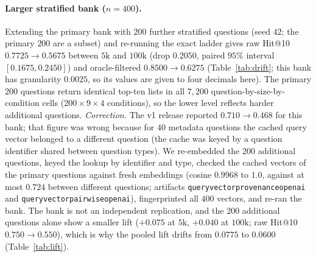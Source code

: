 \documentclass{ieeeaccess}
\makeatletter
\DeclareRobustCommand{\_}{\ifmmode\nfss@text{\textunderscore}\else\textunderscore\allowbreak\fi}
\makeatother
\begin{document}
\paragraph{Larger stratified bank ($n{=}400$).}
Extending the primary bank with $200$ further stratified questions (seed $42$; the primary $200$ are a subset) and re-running the exact ladder gives raw Hit@10 $0.7725{\to}0.5675$ between $5\text{k}$ and $100\text{k}$ (drop $0.2050$, paired $95\%$ interval $[0.1675,0.2450]$) and oracle-filtered $0.8500{\to}0.6275$ (Table~\ref{tab:drift}; this bank has granularity $0.0025$, so its values are given to four decimals here). The primary $200$ questions return identical top-ten lists in all $7{,}200$ question-by-size-by-condition cells ($200\times9\times4$ conditions), so the lower level reflects harder additional questions. \emph{Correction.} The v1 release reported $0.710{\to}0.468$ for this bank; that figure was wrong because for $40$ metadata questions the cached query vector belonged to a different question (the cache was keyed by a question identifier shared between question types). We re-embedded the $200$ additional questions, keyed the lookup by identifier and type, checked the cached vectors of the primary questions against fresh embeddings (cosine $0.9968$ to $1.0$, against at most $0.724$ between different questions; artifacts \texttt{query\_vector\_provenance\_openai} and \texttt{query\_vector\_pairwise\_openai}), fingerprinted all $400$ vectors, and re-ran the bank. The bank is not an independent replication, and the $200$ additional questions alone show a smaller lift ($+0.075$ at $5\text{k}$, $+0.040$ at $100\text{k}$; raw Hit@10 $0.750{\to}0.550$), which is why the pooled lift drifts from $0.0775$ to $0.0600$ (Table~\ref{tab:lift}).
\end{document}
